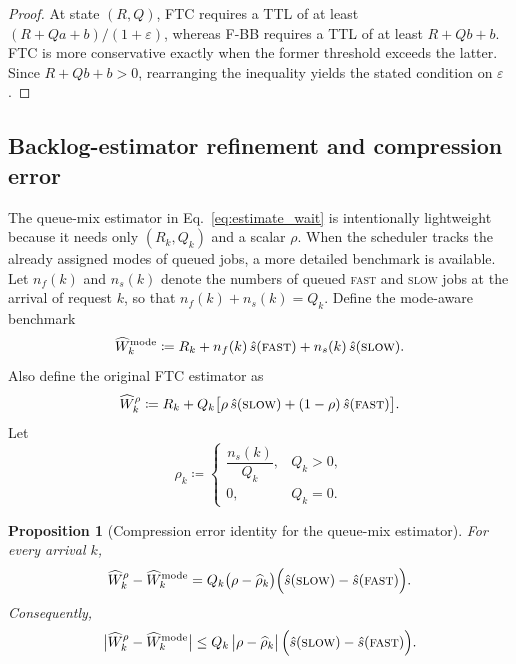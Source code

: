 \documentclass[preprint,12pt]{elsarticle}
\newtheorem{proposition}[theorem]{Proposition}
\begin{document}
\begin{proof}
At state $(R,Q)$, FTC requires a TTL of at least $(R+Qa+b)/(1+\varepsilon)$, whereas F-BB requires a TTL of at least $R+Qb+b$. FTC is more conservative exactly when the former threshold exceeds the latter. Since $R+Qb+b>0$, rearranging the inequality yields the stated condition on $\varepsilon$.
\end{proof}

\subsection{Backlog-estimator refinement and compression error}
\label{sec:ftc_estimator_refinement}

The queue-mix estimator in Eq.~\eqref{eq:estimate_wait} is intentionally lightweight because it needs only $(R_k,Q_k)$ and a scalar $\rho$. When the scheduler tracks the already assigned modes of queued jobs, a more detailed benchmark is available. Let $n_f(k)$ and $n_s(k)$ denote the numbers of queued \textsc{fast} and \textsc{slow} jobs at the arrival of request $k$, so that $n_f(k)+n_s(k)=Q_k$. Define the mode-aware benchmark
\[
\widehat W_k^{\mathrm{mode}}
\coloneqq R_k + n_f(k)\,\hat{s}(\textsc{fast}) + n_s(k)\,\hat{s}(\textsc{slow}).
\]
Also define the original FTC estimator as
\[
\widehat W_k^{\rho}
\coloneqq R_k + Q_k\bigl[\rho\,\hat{s}(\textsc{slow}) + (1-\rho)\,\hat{s}(\textsc{fast})\bigr].
\]
Let
\[
\widehat\rho_k \coloneqq
\begin{cases}
\dfrac{n_s(k)}{Q_k}, & Q_k>0,\\[6pt]
0, & Q_k=0.
\end{cases}
\]

\begin{proposition}[Compression error identity for the queue-mix estimator]
\label{prop:compression_error}
For every arrival $k$,
\[
\widehat W_k^{\rho} - \widehat W_k^{\mathrm{mode}}
= Q_k\bigl(\rho-\widehat\rho_k\bigr)\Bigl(\hat{s}(\textsc{slow})-\hat{s}(\textsc{fast})\Bigr).
\]
Consequently,
\[
\bigl|\widehat W_k^{\rho} - \widehat W_k^{\mathrm{mode}}\bigr|
\le Q_k\,\bigl|\rho-\widehat\rho_k\bigr|\,\Bigl(\hat{s}(\textsc{slow})-\hat{s}(\textsc{fast})\Bigr).
\]
\end{proposition}
\end{document}
